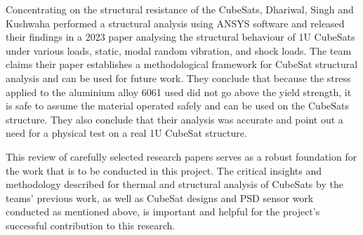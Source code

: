 Concentrating on the structural resistance of the CubeSats, Dhariwal, Singh and Kushwaha performed a structural analysis using ANSYS software and released their findings in a 2023 paper analysing the structural behaviour of 1U CubeSats under various loads, static, modal random vibration, and shock loads. 
The team claims their paper establishes a methodological framework for CubeSat structural analysis and can be used for future work. 
They conclude that because the stress applied to the aluminium alloy 6061 used did not go above the yield strength, it is safe to assume the material operated safely and can be used on the CubeSats structure. 
They also conclude that their analysis was accurate and point out a need for a physical test on a real 1U CubeSat structure\cite{RefWorks:dhariwal2023structural}.

This review of carefully selected research papers serves as a robust foundation for the work that is to be conducted in this project. 
The critical insights and methodology described for thermal and structural analysis of CubeSats by the teams' previous work, as well as CubeSat designs and PSD sensor work conducted as mentioned above, is important and helpful for the project's successful contribution to this research.